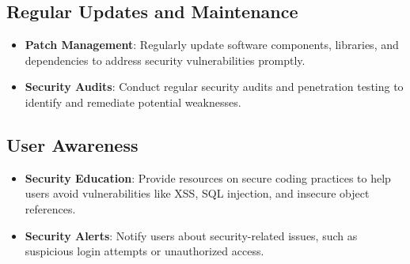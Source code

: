\subsection{Regular Updates and Maintenance}
\begin{itemize}
	\item \textbf{Patch Management}: Regularly update software components, libraries, and dependencies to address security vulnerabilities promptly.
	\item \textbf{Security Audits}: Conduct regular security audits and penetration testing to identify and remediate potential weaknesses.
\end{itemize}

\subsection{User Awareness}
\begin{itemize}
	\item \textbf{Security Education}: Provide resources on secure coding practices to help users avoid vulnerabilities like XSS, SQL injection, and insecure object references.
	\item \textbf{Security Alerts}: Notify users about security-related issues, such as suspicious login attempts or unauthorized access.
\end{itemize}





